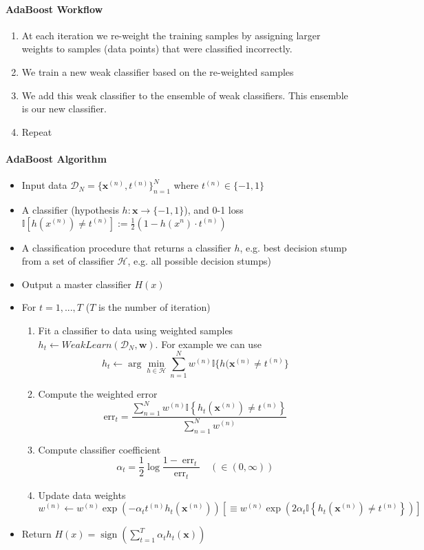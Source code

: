 \documentclass[10pt]{article}
\newcommand{\bw}{\mathbf{w}}
\newcommand{\bx}{\mathbf{x}}
\begin{document}
\paragraph{AdaBoost Workflow}
\begin{enumerate}
    \setlength\itemsep{-0.45em}
    \item At each iteration we re-weight the training samples by assigning larger weights to samples (data points) that were classified incorrectly. 
    \item We train a new weak classifier based on the re-weighted samples
    \item We add this weak classifier to the ensemble of weak classifiers. This ensemble is our new classifier.
    \item Repeat
\end{enumerate}

\paragraph{AdaBoost Algorithm}
\begin{itemize}
    \setlength\itemsep{-0.4em}
    \item Input data $\mathcal{D}_N = \{\bx^{(n)}, t^{(n)}\}_{n = 1}^N$ where $t^{(n)}\in \{-1, 1\}$
    \item A classifier (hypothesis $h:\bx \to \{-1, 1\}$), and 0-1 loss $\mathbb{I}[h(x^{(n)})\neq t^{(n)}] := \frac{1}{2}(1 - h(x^{n})\cdot t^{(n)})$ 
    \item A classification procedure that returns a classifier $h$, e.g. best decision stump from a set of classifier $\mathcal{H}$, e.g. all possible decision stumps)
    \item Output a master classifier $H(x)$
    \item For $t = 1,...,T$ ($T$ is the number of iteration)
    \begin{enumerate}
    \setlength\itemsep{-1.8em}
    \item Fit a classifier to data using weighted samples $h_t \gets WeakLearn(\mathcal{D}_N,\bw)$. For example we can use $$h_t \gets \arg\min_{h \in \mathcal{H}}\sum_{n = 1}^N w^{(n)}\mathbb{I} \{h(\bx^{(n)} \neq t^{(n)}\} $$
    \item Compute the weighted error $$\mathrm{err}_t = \frac{\sum_{n=1}^{N} w^{(n)} \mathbb{I}\left\{h_{t}\left(\mathbf{x}^{(n)}\right) \neq t^{(n)}\right\}}{\sum_{n=1}^{N} w^{(n)}}$$
    \item Compute classifier coefficient $$\alpha_{t}=\frac{1}{2} \log \frac{1-\operatorname{err}_{t}}{\operatorname{err}_{t}} \quad(\in(0, \infty))$$
    \item Update data weights $$w^{(n)} \leftarrow w^{(n)} \exp \left(-\alpha_{t} t^{(n)} h_{t}\left(\mathbf{x}^{(n)}\right)\right)\left[\equiv w^{(n)} \exp \left(2 \alpha_{t} \mathbb{I}\left\{h_{t}\left(\mathbf{x}^{(n)}\right) \neq t^{(n)}\right\}\right)\right]$$
\end{enumerate}
    \item Return $H(x) = \operatorname{sign}\left(\sum_{t=1}^{T} \alpha_{t} h_{t}(\mathbf{x})\right)$
\end{itemize}
\end{document}
